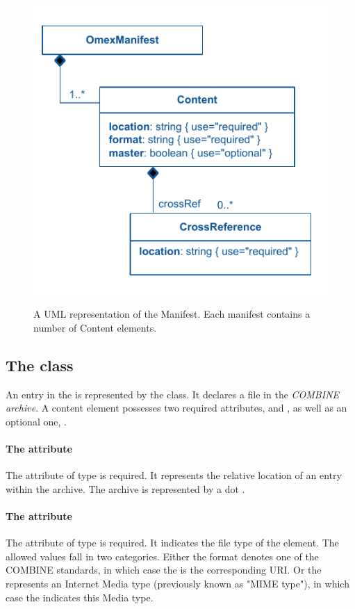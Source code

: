 \begin{figure}[h!]
  \centering
  \includegraphics[width=12cm]{images/OmexManifest.pdf}\\
  \caption{A UML representation of the Manifest. Each manifest contains a number of Content elements.}
  \label{fig:combine_uml}
\end{figure}

\subsection{The  class}
\label{content-class}
An entry in the \OmexManifest is represented by the \Content class. It declares a file in the \emph{COMBINE archive}. A content element possesses two required attributes,  and , as well as an optional one, . 

\paragraph{The  attribute}
The  attribute of type 
 is required. It represents the relative location of an entry within the 
archive. The archive is represented by a dot . 

\paragraph{The  attribute}
The  attribute of type  is required. It 
indicates the file type of the \Content element. The allowed values fall in two categories. Either the format 
denotes one of the COMBINE standards, in which case the  
is the corresponding  URI. Or the 
 represents an Internet Media type \citep{rfc2046} (previously known as "MIME type"), in which case the  indicates this Media type.


